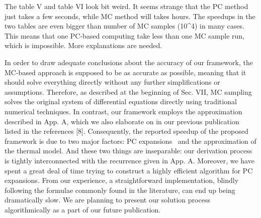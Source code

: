 \begin{reviewer}
The table V and table VI look  bit weird.  It seems strange that the PC method just takes a few seconds, while MC method will takes hours. The speedups in the two tables  are even bigger than number of MC samples (10\^{}4) in many cases. This means that one PC-based computing take less than one MC sample run, which is impossible.  More explanations are needed.
\end{reviewer}
\begin{authors}
In order to draw adequate conclusions about the accuracy of our framework, the MC-based approach is supposed to be as accurate as possible, meaning that it should solve everything directly without any further simplifications or assumptions.
Therefore, as described at the beginning of Sec. VII, MC sampling solves the original system of differential equations directly using traditional numerical techniques.
In contrast, our framework employs the approximation described in App. A, which we also elaborate on in our previous publication listed in the references [8].
Consequently, the reported speedup of the proposed framework is due to two major factors: PC expansions \perse\ and the approximation of the thermal model.
And these two things are inseparable: our derivation process is tightly interconnected with the recurrence given in App. A.
Moreover, we have spent a great deal of time trying to construct a highly efficient algorithm for PC expansions.
From our experience, a straightforward implementation, blindly following the formulae commonly found in the literature, can end up being dramatically slow.
We are planning to present our solution process algorithmically as a part of our future publication.
\end{authors}
%
%

